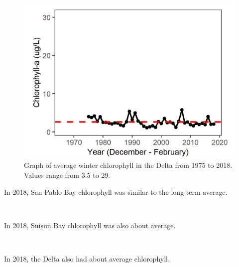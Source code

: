 \documentclass[
]{book}
\begin{document}
\begin{panel-grid}
\begin{columns-nocenter}
\begin{column800}
\begin{expand}
\begin{figure}
\includegraphics[width=15.25in]{figures/chla_dtwinter} \caption{Graph of average winter chlorophyll in the Delta from 1975 to 2018. Values range from 3.5 to 29.}\label{fig:unnamed-chunk-160}
\end{figure}

\end{expand}

\end{column800}

\end{columns-nocenter}

\begin{columns-nocenter}

\begin{column800}

In 2018, San Pablo Bay chlorophyll was similar to the long-term average.

\end{column800}

\begin{column40}

~

\end{column40}

\begin{column800}

In 2018, Suisun Bay chlorophyll was also about average.

\end{column800}

\begin{column40}

~

\end{column40}

\begin{column800}

In 2018, the Delta also had about average chlorophyll.

\end{column800}

\end{columns-nocenter}

\end{panel-grid}
\end{document}
